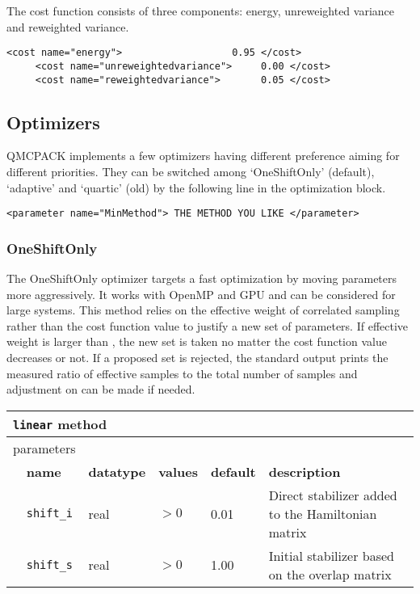 The cost function consists of three components: energy, unreweighted variance and reweighted variance.
\begin{lstlisting}[style=QMCPXML]
     <cost name="energy">                   0.95 </cost>
     <cost name="unreweightedvariance">     0.00 </cost>
     <cost name="reweightedvariance">       0.05 </cost>
\end{lstlisting}

\subsection{Optimizers}
QMCPACK implements a few optimizers having different preference aiming for different priorities.
They can be switched among  `OneShiftOnly' (default), `adaptive' and `quartic' (old) by the following line in the optimization block.
\begin{lstlisting}
<parameter name="MinMethod"> THE METHOD YOU LIKE </parameter>
\end{lstlisting}

\subsubsection{OneShiftOnly}
The OneShiftOnly optimizer targets a fast optimization by moving parameters more aggressively. It works with OpenMP and GPU and can be considered for large systems.
This method relies on the effective weight of correlated sampling rather than the cost function value to justify a new set of parameters.
If effective weight is larger than , the new set is taken no matter the cost function value decreases or not.
If a proposed set is rejected, the standard output prints the measured ratio of effective samples to the total number of samples
and adjustment on  can be made if needed.

\begin{table}[h]
\begin{center}
\begin{tabularx}{\textwidth}{l l l l l l }
\hline
\multicolumn{6}{l}{\texttt{linear} method} \\
\hline
\multicolumn{2}{l}{parameters}  & \multicolumn{4}{l}{}\\
   &   \bfseries name     & \bfseries datatype & \bfseries values & \bfseries default   & \bfseries description \\
   &   \texttt{shift\_i} &  real     & $>0$ & 0.01 & Direct stabilizer added to the Hamiltonian matrix\\
   &   \texttt{shift\_s} &  real     & $>0$ & 1.00 & Initial stabilizer based on the overlap matrix\\
  \hline
\end{tabularx}
\end{center}
\end{table}

